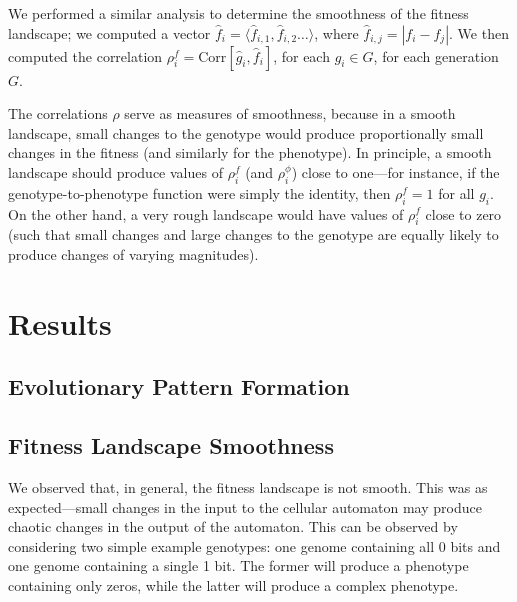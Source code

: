 \documentclass[twocolumn]{article}
\newcommand{\seq}[1]{\langle #1 \rangle}
\newcommand{\corr}[2]{\text{Corr}\left[#1, #2\right]}
\begin{document}
We performed a similar analysis to determine the smoothness of the fitness landscape; we computed a vector $\hat{f}_i = \seq{\hat{f}_{i,1}, \hat{f}_{i,2} \ldots}$, where $\hat{f}_{i,j} = |f_i - f_j|$. We then computed the correlation $\rho_i^f = \corr{\hat{g}_i}{\hat{f}_i}$, for each $g_i \in G$, for each generation $G$. 

The correlations $\rho$ serve as measures of smoothness, because in a smooth landscape, small changes to the genotype would produce proportionally small changes in the fitness (and similarly for the phenotype). In principle, a smooth landscape should produce values of $\rho_i^f$ (and $\rho_i^\phi$) close to one---for instance, if the genotype-to-phenotype function were simply the identity, then $\rho_i^f = 1$ for all $g_i$. On the other hand, a very rough landscape would have values of $\rho_i^f$ close to zero (such that small changes and large changes to the genotype are equally likely to produce changes of varying magnitudes).

\section{Results}

\subsection{Evolutionary Pattern Formation}


\subsection{Fitness Landscape Smoothness}

We observed that, in general, the fitness landscape is not smooth. This was as expected---small changes in the input to the cellular automaton may produce chaotic changes in the output of the automaton. This can be observed by considering two simple example genotypes: one genome containing all 0 bits and one genome containing a single 1 bit. The former will produce a phenotype containing only zeros, while the latter will produce a complex phenotype.
\end{document}
